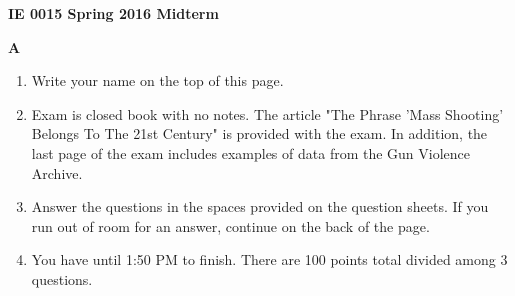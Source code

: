 \documentclass[12pt, letter, addpoints]{exam}
\begin{document}



\centering
{\bf IE 0015 Spring 2016 Midterm}

\centering
{\bf A}





\begin{enumerate}
\def\labelenumi{\arabic{enumi}.}
\itemsep1pt\parskip0pt
\item
  Write your name on the top of this page.
\item
  Exam is closed book with no notes. The article "The Phrase 'Mass Shooting' Belongs To The 21st Century" is provided with the exam. In addition, the last page of the exam includes examples of data from the Gun Violence Archive.
\item
  Answer the questions in the spaces provided on the question sheets. If you run out of room for an answer, continue on the back of the page.
\item
  You have until 1:50 PM to finish. There are 100 points total divided among 3 questions.
\end{enumerate}
\end{document}
